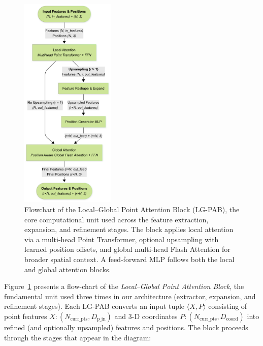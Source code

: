 \documentclass[preprint,12pt,authoryear]{elsarticle}
\begin{document}
\begin{figure}
  \centering
  \includegraphics[width=0.4\textwidth]{manuscript/figures/LG-PAB.png}
  \caption{Flowchart of the Local–Global Point Attention Block (LG-PAB), the core computational unit used across the feature extraction, expansion, and refinement stages. The block applies local attention via a multi-head Point Transformer, optional upsampling with learned position offsets, and global multi-head Flash Attention for broader spatial context. A feed-forward MLP follows both the local and global attention blocks.} 
  \label{fig:lgpab}
\end{figure}%

Figure~\ref{fig:lgpab} presents a flow-chart of the \emph{Local–Global Point Attention Block}, the fundamental unit used three times in our architecture (extractor, expansion, and refinement stages).  
Each LG-PAB converts an input tuple $\langle X, P \rangle$ consisting of point features $X: (N_{\text{curr\_pts}}, D_{\text{p\_in}})$ and 3-D coordinates $P: (N_{\text{curr\_pts}}, D_{\text{coord}})$ into refined (and optionally upsampled) features and positions. The block proceeds through the stages that appear in the diagram:
\end{document}
